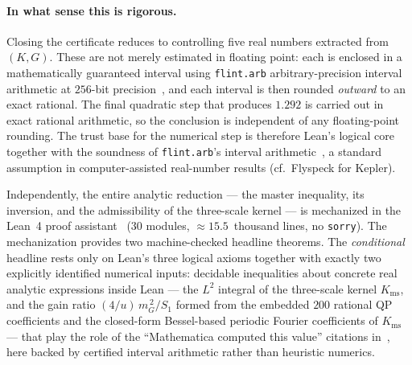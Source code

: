 \documentclass[11pt, letterpaper]{article}
\theoremstyle{paperplain}
\theoremstyle{paperdef}
\newcommand{\Kms}{K_{\mathrm{ms}}}
\begin{document}
\paragraph{In what sense this is rigorous.}
Closing the certificate reduces to controlling five real numbers
extracted from $(K,G)$.  These are not merely estimated in floating
point: each is enclosed in a mathematically guaranteed interval using
\texttt{flint.arb} arbitrary-precision interval arithmetic at $256$-bit
precision~\cite{Flint}, and each interval is then rounded
\emph{outward} to an exact rational.  The final quadratic step that
produces $1.292$ is carried out in exact rational arithmetic, so the
conclusion is independent of any floating-point rounding.
The trust base for the numerical step is therefore Lean's logical
core together with the soundness of \texttt{flint.arb}'s interval
arithmetic~\cite{Flint}, a standard assumption in computer-assisted
real-number results (cf.\ Flyspeck for Kepler).

Independently, the entire analytic reduction --- the master
inequality, its inversion, and the admissibility of the three-scale
kernel --- is mechanized in the Lean~4 proof
assistant~\cite{Lean,Mathlib} ($30$ modules, $\approx 15.5$~thousand
lines, no \texttt{sorry}).  The mechanization provides two
machine-checked headline theorems.  The \emph{conditional} headline
rests only on Lean's three logical axioms together with exactly two
explicitly identified numerical inputs: decidable inequalities about
concrete real analytic expressions inside Lean --- the $L^2$ integral
of the three-scale kernel $\Kms$, and the gain ratio
$(4/u)\,m_G^{\,2}/S_1$ formed from the embedded $200$ rational QP
coefficients and the closed-form Bessel-based periodic Fourier
coefficients of $\Kms$ --- that play the role of the ``Mathematica
computed this value'' citations in~\cite{MV10}, here backed by
certified interval arithmetic rather than heuristic numerics.
\end{document}
